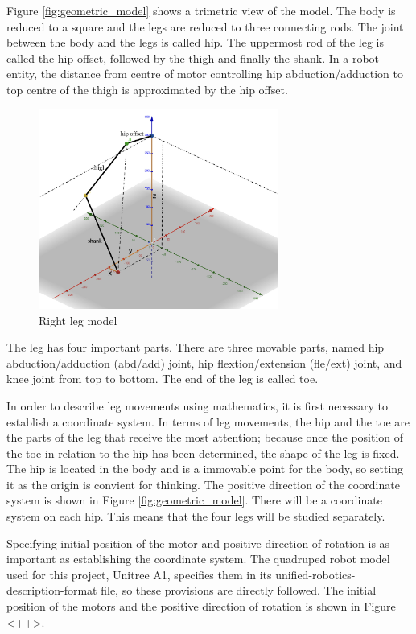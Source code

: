 Figure \ref{fig:geometric_model} shows a trimetric view of the model. The body is reduced to a square and the legs are reduced to three connecting rods. The joint between the body and the legs is called hip. The uppermost rod of the leg is called the hip offset, followed by the thigh and finally the shank. In a robot entity, the distance from centre of motor controlling hip abduction/adduction to top centre of the thigh is approximated by the hip offset.

\begin{figure}[htbp]
   \centering
   \includegraphics[width=0.7\textwidth]{figures/right_leg_model.jpg}
   \caption{Right leg model}
   \label{fig:right_leg_model}
\end{figure}

The leg has four important parts. There are three movable parts, named hip abduction/adduction (abd/add) joint, hip flextion/extension (fle/ext) joint, and knee joint from top to bottom. The end of the leg is called toe.

In order to describe leg movements using mathematics, it is first necessary to establish a coordinate system. In terms of leg movements, the hip and the toe are the parts of the leg that receive the most attention; because once the position of the toe in relation to the hip has been determined, the shape of the leg is fixed. The hip is located in the body and is a immovable point for the body, so setting it as the origin is convient for thinking. The positive direction of the coordinate system is shown in Figure \ref{fig:geometric_model}. There will be a coordinate system on each hip. This means that the four legs will be studied separately.

Specifying initial position of the motor and positive direction of rotation is as important as establishing the coordinate system. The quadruped robot model used for this project, Unitree A1, specifies them in its unified-robotics-description-format file, so these provisions are directly followed. The initial position of the motors and the positive direction of rotation is shown in Figure <++>.

